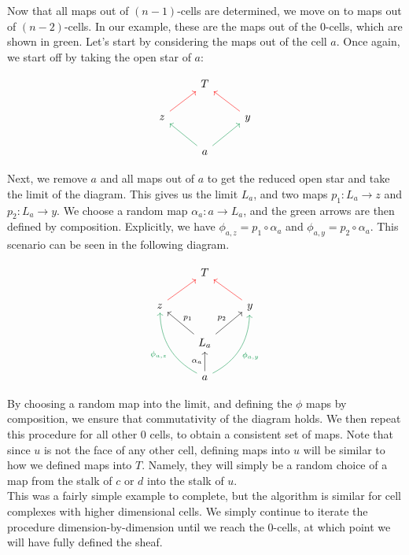 \documentclass{article}
\theoremstyle{definition}
\begin{document}
Now that all maps out of $(n-1)$-cells are determined, we move on to maps out of $(n-2)$-cells. In our example, these are the maps out of the $0$-cells, which are shown in green. Let's start by considering the maps out of the cell $a$. Once again, we start off by taking the open star of $a$:

\[
\begin{tikzcd}
	& T & \\
	z \arrow[red]{ur} &  & y \arrow[red]{ul} \\
	& a \arrow[ForestGreen]{ul} \arrow[ForestGreen]{ur} & 
\end{tikzcd}
\]

Next, we remove $a$ and all maps out of $a$ to get the reduced open star and take the limit of the diagram. This gives us the limit $L_a$, and two maps $p_1 : L_a \rightarrow z$ and $p_2: L_a \rightarrow y$. We choose a random map $\alpha_a: a \rightarrow L_a$, and the green arrows are then defined by composition. Explicitly, we have $\phi_{a,z} = p_1 \circ \alpha_a$ and $\phi_{a,y} = p_2 \circ \alpha_a$.  This scenario can be seen in the following diagram. 

\[
\begin{tikzcd}
	& T & \\
	z \arrow[red]{ur} &  & y \arrow[red]{ul} \\
	& L_a \arrow[swap,"p_1"]{ul} \arrow["p_2"]{ur} & \\
	& a \arrow{u}{\alpha_a} \arrow[ForestGreen,bend left]{uul}{\phi_{a,z}} \arrow[swap, ForestGreen, bend right,"\phi_{a,y}"]{uur} &
\end{tikzcd}	
\]

By choosing a random map into the limit, and defining the $\phi$ maps by composition,  we ensure that commutativity of the diagram holds. We then repeat this procedure for all other $0$ cells, to obtain a consistent set of maps. Note that since $u$ is not the face of any other cell, defining maps into $u$ will be similar to how we defined maps into $T$. Namely, they will simply be a random choice of a map from the stalk of $c$ or $d$ into the stalk of $u$. \\

This was a fairly simple example to complete, but the algorithm is similar for cell complexes with higher dimensional cells. We simply continue to iterate the procedure dimension-by-dimension until we reach the $0$-cells, at which point we will have fully defined the sheaf. \\
\end{document}
